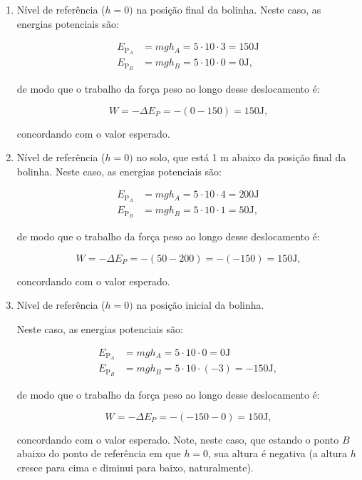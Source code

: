 \begin{enumerate}
    \item [(i)] Nível de referência ($h=0)$ na posição final da bolinha. Neste caso, as energias potenciais são:

    \begin{align}
        E_{\text{P}_A} &= mgh_A = 5 \cdot 10 \cdot 3 = 150 \text{J} \nonumber \\
          E_{\text{P}_B} &= mgh_B = 5 \cdot 10 \cdot 0 = 0 \text{J}, \nonumber 
    \end{align}

\noindent de modo que o trabalho da força peso ao longo desse deslocamento é:

$$ W = -\Delta E_P = -(0-150) = 150 \text{J,}$$

\noindent concordando com o valor esperado.
    

    \item [(ii)] Nível de referência ($h=0)$ no solo, que está 1 m abaixo da posição final da bolinha.  Neste caso, as energias potenciais são:

    \begin{align}
        E_{\text{P}_A} &= mgh_A = 5 \cdot 10 \cdot 4 = 200 \text{J} \nonumber \\
          E_{\text{P}_B} &= mgh_B = 5 \cdot 10 \cdot 1 = 50 \text{J}, \nonumber 
    \end{align}

\noindent de modo que o trabalho da força peso ao longo desse deslocamento é:

$$ W = -\Delta E_P = -(50-200) = -(-150) =150 \text{J,}$$

\noindent concordando com o valor esperado.

    \item [(iii)]   Nível de referência ($h=0)$ na posição inicial da bolinha. 

 Neste caso, as energias potenciais são:

    \begin{align}
        E_{\text{P}_A} &= mgh_A = 5 \cdot 10 \cdot 0 = 0 \text{J} \nonumber \\
          E_{\text{P}_B} &= mgh_B = 5 \cdot 10 \cdot (-3) = -150 \text{J}, \nonumber 
    \end{align}

\noindent de modo que o trabalho da força peso ao longo desse deslocamento é:

$$ W = -\Delta E_P = - (-150-0) = 150 \text{J,}$$

\noindent concordando com o valor esperado. Note, neste caso, que estando o ponto $B$ abaixo do ponto de referência em que $h=0$, sua altura é negativa (a altura $h$ cresce para cima e diminui para baixo, naturalmente).
    
\end{enumerate}

